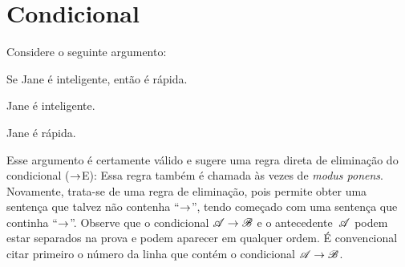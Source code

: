 \section{Condicional}
Considere o seguinte argumento:
\begin{earg}
		\item[] Se Jane é inteligente, então é rápida.
		\item[] Jane é inteligente.
		\item[\texttherefore] Jane é rápida.
\end{earg}
Esse argumento é certamente válido e sugere uma regra direta de eliminação do condicional ($\rightarrow$E):
Essa regra também é chamada às vezes de \emph{modus ponens}. Novamente, trata-se
de uma regra de eliminação, pois permite obter uma sentença que
talvez não contenha \textquotedblleft$\rightarrow$\textquotedblright{}, tendo começado com uma sentença que
continha \textquotedblleft$\rightarrow$\textquotedblright{}. Observe que o condicional $\mathscr{A}\rightarrow\mathscr{B}$
e o antecedente~$\mathscr{A}$ podem estar separados na prova
e podem aparecer em qualquer ordem. É convencional
citar primeiro o número da linha que contém o condicional
$\mathscr{A}\rightarrow\mathscr{B}$.

